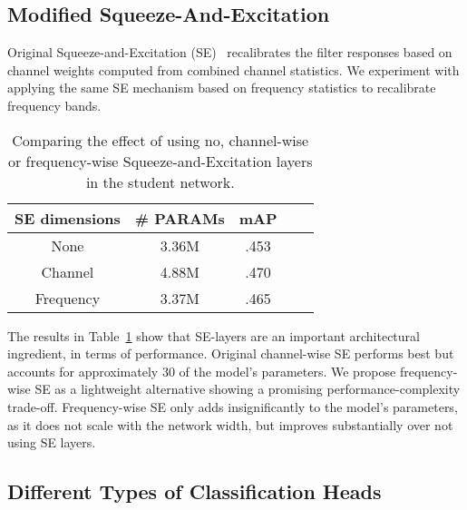 \documentclass{article}
\begin{document}
\subsection{Modified Squeeze-And-Excitation}
\vspace{-4pt}
\label{subsec:se}

Original Squeeze-and-Excitation (SE)~\cite{Hu18Squeeze} recalibrates the filter responses based on channel weights computed from combined channel statistics. We experiment with applying the same SE mechanism based on frequency statistics to recalibrate frequency bands. 



\begin{table}[b]
\begin{center}
\begin{small}
\begin{tabular}{c|cccc}
\textbf{SE dimensions}&\textbf{\# PARAMs} & \textbf{mAP} \\ 
\midrule
None & 3.36M  & .453 \\
\cellcolor{lightgray}Channel & 4.88M   & .470 \\
Frequency & 3.37M   & .465 \\
\bottomrule
\end{tabular}
\caption{Comparing the effect of using no, channel-wise or frequency-wise Squeeze-and-Excitation layers in the student network.} 
\label{tab:se}
\end{small}
\end{center}
\vspace{-14pt}
\end{table}

The results in Table~\ref{tab:se} show that SE-layers are an important architectural ingredient, in terms of performance. Original channel-wise SE performs best but accounts for approximately 30 of the model's parameters. We propose frequency-wise SE as a lightweight alternative showing a promising performance-complexity trade-off. Frequency-wise SE only adds insignificantly to the model's parameters, as it does not scale with the network width, but improves substantially over not using SE layers.

\vspace{-6pt}
\subsection{Different Types of Classification Heads}
\vspace{-4pt}
\label{subsec:heads}
\end{document}
